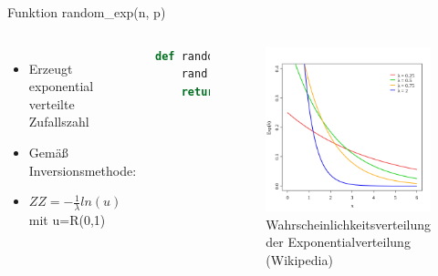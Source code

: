  \begin{frame}[fragile]{Funktion random\_exp(n, p)}
  \begin{columns}
    \begin{itemize}
  	\item Erzeugt exponential verteilte Zufallszahl
  	\item Gemäß Inversionsmethode:
  	\item $ZZ = -\frac{1}{\lambda} ln(u)$ mit u=R(0,1)
  \end{itemize}
  \begin{lstlisting}[language=python]
def random_exp(lambd):
    rand = random.random()
    return -(1/lambd) * log(rand)
\end{lstlisting}
\logopythonbottom
    	\begin{figure}[h!]
    	\includegraphics[scale=0.3]{lib_random_exp_wahrscheinlichkeitsverteilung.png}
  			\caption{Wahrscheinlichkeitsverteilung der Exponentialverteilung \tiny{(Wikipedia)}}
		\end{figure}
  \end{columns}
\end{frame}	


